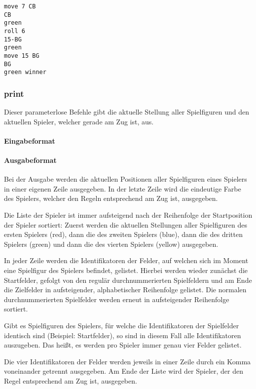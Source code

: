 \begin{tcolorbox}[title=Beispiel]
\begin{verbatim}
move 7 CB
CB
green
roll 6
15-BG
green
move 15 BG
BG
green winner
\end{verbatim}
\end{tcolorbox}

\subsubsection*{print}
Dieser parameterlose Befehle gibt die aktuelle Stellung aller Spielfiguren und den aktuellen Spieler, welcher gerade am Zug ist, aus.
\paragraph{Eingabeformat}
\paragraph{Ausgabeformat}
Bei der Ausgabe werden die aktuellen Positionen aller Spielfiguren eines Spielers in einer eigenen Zeile ausgegeben. In der letzte Zeile wird die eindeutige Farbe des Spielers, welcher den Regeln entsprechend am Zug ist, ausgegeben. 

Die Liste der Spieler ist immer aufsteigend nach der Reihenfolge der Startposition der Spieler sortiert: Zuerst werden die aktuellen Stellungen aller Spielfiguren des ersten Spielers (red), dann die des zweiten Spielers (blue), dann die des dritten Spielers (green) und dann die des vierten Spielers (yellow) ausgegeben. 

In jeder Zeile werden die Identifikatoren der Felder, auf welchen sich im Moment eine Spielfigur des Spielers befindet, gelistet. Hierbei werden wieder zunächst die Startfelder, gefolgt von den regulär durchnummerierten Spielfeldern und am Ende die Zielfelder in aufsteigender, alphabetischer Reihenfolge gelistet. Die normalen durchnummerierten Spielfelder werden erneut in aufsteigender Reihenfolge sortiert.

Gibt es Spielfiguren des Spielers, für welche die Identifikatoren der Spielfelder identisch sind (Beispiel: Startfelder), so sind in diesem Fall alle Identifikatoren auszugeben. Das heißt, es werden pro Spieler immer genau vier Felder gelistet. 

Die vier Identifikatoren der Felder werden jeweils in einer Zeile durch ein Komma voneinander getrennt ausgegeben. Am Ende der Liste wird der Spieler, der den Regel entsprechend am Zug ist, ausgegeben. 

